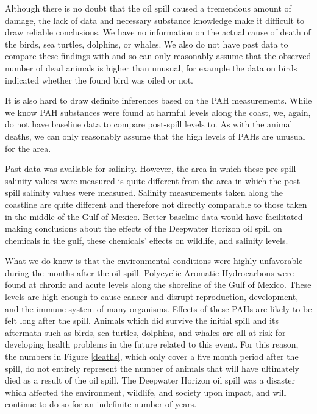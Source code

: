 \documentclass[authoryear,12pt]{elsarticle}
\begin{document}
Although there is no doubt that the oil spill caused a tremendous amount of damage, the lack of data  {and necessary substance knowledge} make it difficult to draw  {reliable} conclusions. We have no information on the actual cause of death of the birds, sea turtles, dolphins,  {or} whales.  We also do not have past data to compare these findings with and so can only reasonably assume that th{e observed} number of dead animals is  {higher than} unusual, {for example the data on birds indicated whether the found bird was oiled or not.} %

It is also hard to  {draw} definite inferences based on the PAH measurements.  While we know PAH substances were found at harmful levels along the coast, we{, again,} do not have baseline data to compare post-spill levels to. As with the animal deaths, we can only reasonably assume that the high levels of PAHs are unusual for the area. 

Past data was available for salinity. However, the area in which these pre-spill salinity values were measured is quite different from the area in which the post-spill salinity values were measured.  Salinity measurements taken along the coastline  {are} quite different and therefore not directly comparable to those taken in the middle of the Gulf of Mexico. Better baseline data would have facilitated making conclusions about the effects of the Deepwater Horizon oil spill on chemicals in the gulf, these chemicals' effects on wildlife, and salinity levels.

What we do know is that the environmental conditions were highly unfavorable during the months after the oil spill. Polycyclic Aromatic Hydrocarbons were found at chronic and acute levels along the shoreline of the Gulf of Mexico. These levels are high enough to cause cancer and disrupt reproduction, development, and the immune system of  {many} organisms. Effects of these PAHs are likely to be felt long after the spill. Animals which did survive the initial spill and its aftermath such as birds, sea turtles, dolphins, and whales are all at risk  {for developing} health problems in the future  {related to this event.} For this reason, the numbers in Figure \ref{deaths}, which only cover a five month period after the spill, do not entirely represent the number of animals that will have ultimately died as a result of the oil spill. The Deepwater Horizon oil spill was a disaster which affected the environment, wildlife, and society upon impact, and will continue to do so for an indefinite number of years.
\end{document}
